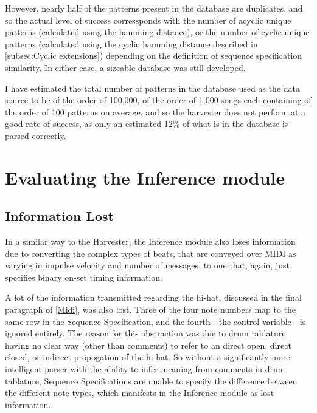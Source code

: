 \documentclass[12pt,twoside,notitlepage]{report}
\begin{document}
					However, nearly half of the patterns present in the database are duplicates, and so the actual level of success corressponds with the number of acyclic unique patterns (calculated using the hamming distance), or the number of cyclic unique patterns (calculated using the cyclic hamming distance described in \ref{subsec:Cyclic extensions}) depending on the definition of sequence specification similarity. In either case, a sizeable database was still developed.
					
					I have estimated the total number of patterns in the database used as the data source to be of the order of 100,000, of the order of 1,000 songs each containing of the order of 100 patterns on average, and so the harvester does not perform at a good rate of success, as only an estimated 12\% of what is in the database is parsed correctly.
					

	\section{Evaluating the Inference module}\label{sec:Eval Inference module}
	
	
	\subsection{Information Lost}
		In a similar way to the Harvester, the Inference module also loses information due to converting the complex types of beats, that are conveyed over MIDI as varying in impulse velocity and number of messages, to one that, again, just specifies binary on-set timing information.
		
		A lot of the information transmitted regarding the hi-hat, discussed in the final paragraph of \ref{Midi}, was also lost. Three of the four note numbers map to the same row in the Sequence Specification, and the fourth - the control variable - is ignored entirely. The reason for this abstraction was due to drum tablature having no clear way (other than comments) to refer to an direct open, direct closed, or indirect propogation of the hi-hat. So without a significantly more intelligent parser with the ability to infer meaning from comments in drum tablature, Sequence Specifications are unable to specify the difference between the different note types, which manifests in the Inference module as lost information. 
\end{document}
